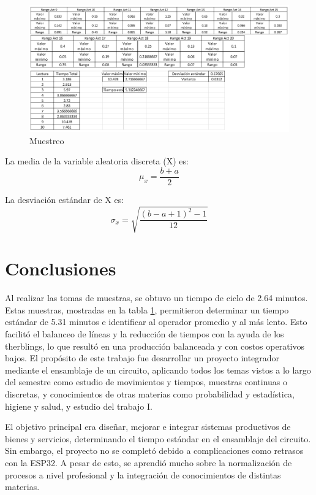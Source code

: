 \begin{figure}[H]
        \centering
        \includegraphics[trim = {0mm 0mm 0mm 0mm},clip,scale=0.4]{10/Img/muestreo3.png}
        \caption{Muestreo}
        \label{muestreo3}
    \end{figure}
La media de la variable aleatoria discreta (X) es:
\begin{equation}
     \mu_x=\dfrac{b+a}{2}
\end{equation}

La desviación estándar de X es:
\begin{equation}
     \sigma_x=\sqrt{\dfrac{(b-a+1)^2-1}{12}}
\end{equation}
\section{Conclusiones}
    
Al realizar las tomas de muestras, se obtuvo un tiempo de ciclo de 2.64 minutos. Estas muestras, mostradas en la tabla \ref{muestreo3}, permitieron determinar un tiempo estándar de 5.31 minutos e identificar al operador promedio y al más lento. Esto facilitó el balanceo de líneas y la reducción de tiempos con la ayuda de los therblings, lo que resultó en una producción balanceada y con costos operativos bajos. 
El propósito de este trabajo fue desarrollar un proyecto integrador mediante el ensamblaje de un circuito, aplicando todos los temas vistos a lo largo del semestre como estudio de movimientos y tiempos, muestras continuas o discretas, y conocimientos de otras materias como probabilidad y estadística, higiene y salud, y estudio del trabajo I.

El objetivo principal era diseñar, mejorar e integrar sistemas productivos de bienes y servicios, determinando el tiempo estándar en el ensamblaje del circuito. Sin embargo, el proyecto no se completó debido a complicaciones como retrasos con la ESP32. A pesar de esto, se aprendió mucho sobre la normalización de procesos a nivel profesional y la integración de conocimientos de distintas materias.

